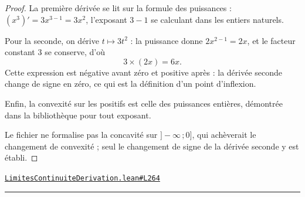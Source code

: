 \documentclass[11pt,a4paper]{article}
\theoremstyle{definition}
\theoremstyle{plain}
\newcommand{\source}[2]{\par\smallskip\noindent\hfill{\footnotesize\href{#1}{\texttt{#2}}}\par\smallskip}
\begin{document}
\begin{proof}
La première dérivée se lit sur la formule des puissances : $(x^{3})' = 3x^{3-1} = 3x^{2}$,
l'exposant $3 - 1$ se calculant dans les entiers naturels.

Pour la seconde, on dérive $t \mapsto 3t^{2}$ : la puissance donne $2x^{2-1} = 2x$, et le
facteur constant $3$ se conserve, d'où
\[ 3 \times (2x) = 6x . \]
Cette expression est négative avant zéro et positive après : la dérivée seconde change de
signe en zéro, ce qui est la définition d'un point d'inflexion.

Enfin, la convexité sur les positifs est celle des puissances entières, démontrée dans la
bibliothèque pour tout exposant.

\medskip\noindent
Le fichier ne formalise pas la concavité sur $]-\infty\,;0]$, qui achèverait le
changement de convexité ; seul le changement de signe de la dérivée seconde y est établi.
\end{proof}
\source{https://github.com/Commutator-IO/learn-lean/blob/main/cours/02-lycee/04-limites-continuite-derivation/LimitesContinuiteDerivation.lean\#L264}{LimitesContinuiteDerivation.lean\#L264}

\vfill
\noindent\rule{0.35\linewidth}{0.4pt}\par
{}
\end{document}

